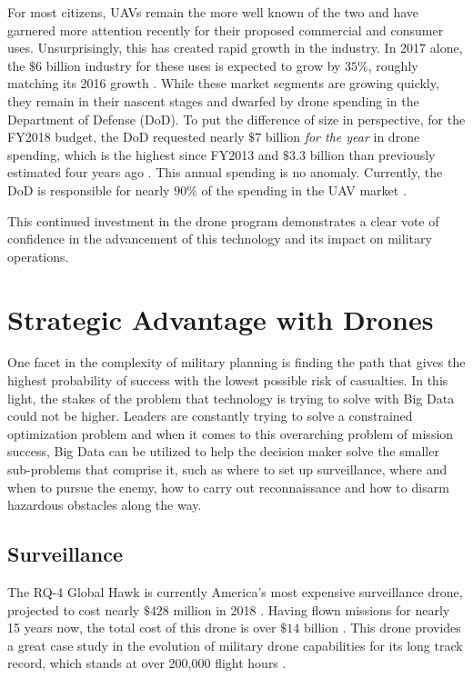 \documentclass[sigconf]{acmart}
\begin{document}
For most citizens, UAVs remain the more well known of the two and have garnered more attention recently for their proposed commercial and consumer uses. Unsurprisingly, this has created rapid growth in the industry. In 2017 alone, the $\$6$ billion industry for these uses is expected to grow by $35\%$, roughly matching its 2016 growth \cite{gartner}. While these market segments are growing quickly, they remain in their nascent stages and dwarfed by drone spending in the Department of Defense (DoD). To put the difference of size in perspective, for the FY2018 budget, the DoD requested nearly $\$7$ billion \emph{for the year} in drone spending, which is the highest since FY2013 and $\$3.3$ billion than previously estimated four years ago \cite{dronebudget}. This annual spending is no anomaly. Currently, the DoD is responsible for nearly $90\%$ of the spending in the UAV market \cite{economist}. 

This continued investment in the drone program demonstrates a clear vote of confidence in the advancement of this technology and its impact on military operations. 




\section{Strategic Advantage with Drones}
One facet in the complexity of military planning is finding the path that gives the highest probability of success with the lowest possible risk of casualties. In this light, the stakes of the problem that technology is trying to solve with Big Data could not be higher. Leaders are constantly trying to solve a constrained optimization problem and when it comes to this overarching problem of mission success, Big Data can be utilized to help the decision maker solve the smaller sub-problems that comprise it, such as where to set up surveillance, where and when to pursue the enemy, how to carry out reconnaissance and how to disarm hazardous obstacles along the way.

\subsection{Surveillance}
The RQ-4 Global Hawk is currently America's most expensive surveillance drone, projected to cost nearly $\$428$ million in 2018 \cite{dronebudget}. Having flown missions for nearly 15 years now, the total cost of this drone is over $\$14$ billion \cite{rq4}. This drone provides a great case study in the evolution of military drone capabilities for its long track record, which stands at over 200,000 flight hours \cite{northrq4}. 
\end{document}
